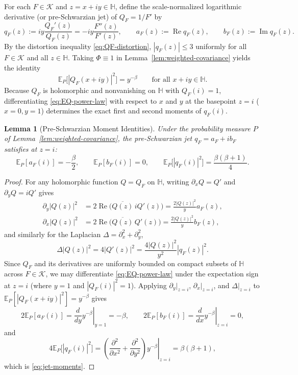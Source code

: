 \documentclass[12pt]{article}
\def\H{\mathbb{H}}
\def\K{\mathcal{K}}
\def\E{\mathbb{E}}
\newtheorem{lemma}[thm]{Lemma}
\theoremstyle{definition}
\numberwithin{equation}{section}
\begin{document}
For each $F \in \K$ and $z = x+iy \in \H$, define the scale-normalized logarithmic derivative (or pre-Schwarzian jet) of $Q_F = 1/F'$ by
\begin{equation}\label{eq:qF-def}
  q_F(z) := i y \frac{Q_F'(z)}{Q_F(z)} = -i y \frac{F''(z)}{F'(z)}, \qquad a_F(z) := \operatorname{Re} q_F(z), \qquad b_F(z) := \operatorname{Im} q_F(z).
\end{equation}
By the distortion inequality \eqref{eq:QF-distortion}, $|q_F(z)| \le 3$ uniformly for all $F \in \K$ and all $z \in \H$. Taking $\Phi \equiv 1$ in Lemma~\ref{lem:weighted-covariance} yields the identity
\begin{equation}\label{eq:EQ-power-law}
  \E_P\Big[|Q_F(x + iy)|^2\Big] = y^{-\beta} \qquad \text{for all } x + iy \in \H.
\end{equation}
Because $Q_F$ is holomorphic and nonvanishing on $\H$ with $Q_F(i) = 1$, differentiating \eqref{eq:EQ-power-law} with respect to $x$ and $y$ at the basepoint $z = i$ ($x = 0, y = 1$) determines the exact first and second moments of $q_F(i)$.

\begin{lemma}[Pre-Schwarzian Moment Identities]\label{lem:jet-moments}
Under the probability measure $P$ of Lemma~\ref{lem:weighted-covariance}, the pre-Schwarzian jet $q_F = a_F + i b_F$ satisfies at $z = i$:
\begin{equation}\label{eq:jet-moments}
  \E_P[a_F(i)] = -\frac{\beta}{2}, \qquad \E_P[b_F(i)] = 0, \qquad \E_P\Big[|q_F(i)|^2\Big] = \frac{\beta(\beta + 1)}{4}.
\end{equation}
\end{lemma}

\begin{proof}
For any holomorphic function $Q = Q_F$ on $\H$, writing $\partial_x Q = Q'$ and $\partial_y Q = i Q'$ gives
\[
\begin{aligned}
  \partial_y |Q(z)|^2 &= 2 \operatorname{Re}\!\big(\overline{Q(z)}\, i Q'(z)\big) = \frac{2 |Q(z)|^2}{y} a_F(z), \\
  \partial_x |Q(z)|^2 &= 2 \operatorname{Re}\!\big(\overline{Q(z)}\, Q'(z)\big) = \frac{2 |Q(z)|^2}{y} b_F(z),
\end{aligned}
\]
and similarly for the Laplacian $\Delta = \partial_x^2 + \partial_y^2$,
\[
  \Delta |Q(z)|^2 = 4 |Q'(z)|^2 = \frac{4 |Q(z)|^2}{y^2} |q_F(z)|^2.
\]
Since $Q_F$ and its derivatives are uniformly bounded on compact subsets of $\H$ across $F \in \K$, we may differentiate \eqref{eq:EQ-power-law} under the expectation sign at $z = i$ (where $y = 1$ and $|Q_F(i)|^2 = 1$). Applying $\partial_y|_{z=i}$, $\partial_x|_{z=i}$, and $\Delta|_{z=i}$ to $\E_P[|Q_F(x+iy)|^2] = y^{-\beta}$ gives
\[
  2 \E_P[a_F(i)] = \left.\frac{d}{dy} y^{-\beta}\right|_{y=1} = -\beta, \qquad 2 \E_P[b_F(i)] = \left.\frac{d}{dx} y^{-\beta}\right|_{z=i} = 0,
\]
and
\[
  4 \E_P\Big[|q_F(i)|^2\Big] = \left.\left(\frac{\partial^2}{\partial x^2} + \frac{\partial^2}{\partial y^2}\right) y^{-\beta}\right|_{z=i} = \beta(\beta + 1),
\]
which is \eqref{eq:jet-moments}.
\end{proof}
\end{document}
